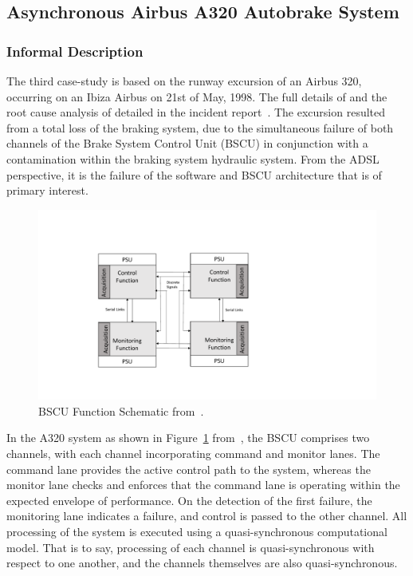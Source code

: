\subsection{Asynchronous  Airbus A320 Autobrake System}
\label{airbuscs}

\subsubsection{Informal Description}

The third  case-study is based on the runway excursion of an Airbus 320, occurring on
an Ibiza Airbus on 21st of May, 1998.  The full details of and the root cause
analysis of detailed in the incident report~\cite{a320ibiza}.  The excursion
resulted from a total loss of the braking system, due to the simultaneous
failure of  both channels of the Brake System Control Unit (BSCU) in conjunction
with a contamination within the braking system hydraulic system. From the ADSL
perspective, it is the failure of the software and BSCU architecture that is of
primary interest.

\begin{figure}
\begin{center}
\includegraphics[width=\textwidth]{figures/BSCU.pdf}
\caption{BSCU Function Schematic from~\cite{a320ibiza}.}
\label{fig:BSCU_schematic}
\end{center}
\end{figure}

In the A320 system as shown in Figure~\ref{fig:BSCU_schematic} from~\cite{a320ibiza}, the BSCU comprises two channels, with each channel incorporating command and monitor lanes.  The command lane provides the active
control path to the system, whereas the monitor lane checks and enforces that
the command lane is operating within the expected envelope of performance. On
the detection of the first failure, the monitoring lane indicates a failure, and
control is passed to the other channel.  All processing of the system is
executed using a quasi-synchronous computational model. That is to say,
processing of each channel is quasi-synchronous with respect to one another,
and the channels themselves are also quasi-synchronous.

